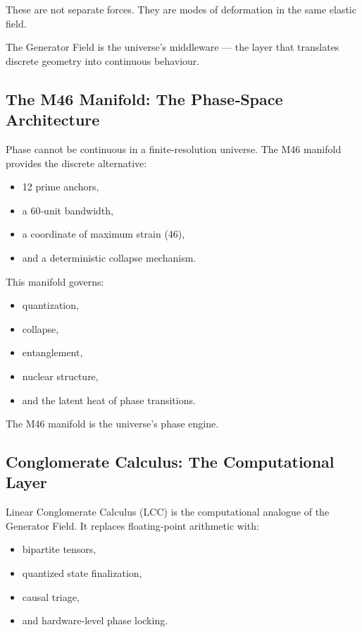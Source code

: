 \documentclass[reprint,amsmath,amssymb,aps,prl,floatfix]{revtex4-2}
\begin{document}
\begin{itemize}
These are not separate forces.  
They are modes of deformation in the same elastic field.
\medskip

The Generator Field is the universe’s middleware — the layer that translates discrete geometry into continuous behaviour.

\subsection{The M46 Manifold: The Phase‑Space Architecture}

Phase cannot be continuous in a finite‑resolution universe.  
The M46 manifold provides the discrete alternative:

\begin{itemize}
\item 12 prime anchors,  
\item a 60‑unit bandwidth,  
\item a coordinate of maximum strain (46),  
\item and a deterministic collapse mechanism.
\end{itemize}
\medskip

This manifold governs:
\begin{itemize}
\item quantization,  
\item collapse,  
\item entanglement,  
\item nuclear structure,  
\item and the latent heat of phase transitions.
\end{itemize}

The M46 manifold is the universe’s phase engine.

\subsection{Conglomerate Calculus: The Computational Layer}

Linear Conglomerate Calculus (LCC) is the computational analogue of the Generator Field. It replaces floating‑point arithmetic with:

\begin{itemize}
\item bipartite tensors,  
\item quantized state finalization,  
\item causal triage,  
\item and hardware‑level phase locking.
\end{itemize}
\medskip


\end{itemize}
\end{document}
